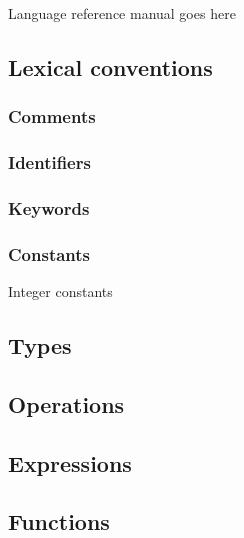 Language reference manual goes here

\subsection{Lexical conventions}

\subsubsection{Comments}

\subsubsection{Identifiers}

\subsubsection{Keywords}

\subsubsection{Constants}
Integer constants

\subsection{Types}

\subsection{Operations}

\subsection{Expressions}

\subsection{Functions}